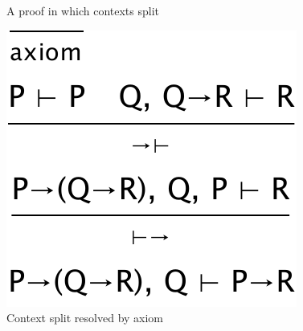 \begin{figure}
\centering
{}\qquad
{}\qquad
{}\qquad
\caption{A proof in which contexts split}
\label{fig:unifiesproviso}
\end{figure}


\begin{figure}
\centering
\includegraphics[scale=0.5]{pics/unifiesprovisoresolved}
\caption{Context split resolved by axiom}
\label{fig:unifiesprovisoresolved}
\end{figure}


